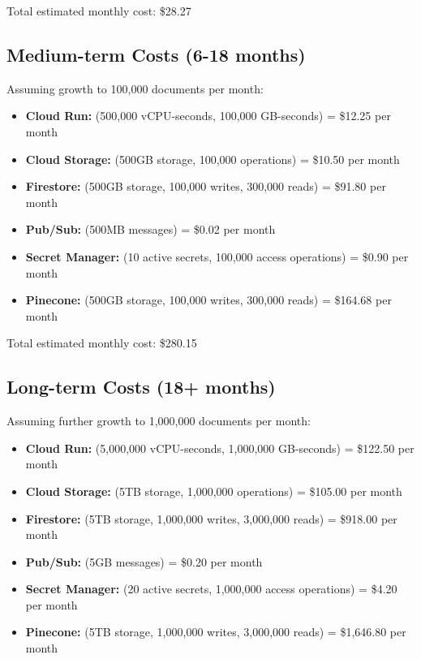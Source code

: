 \documentclass[a4paper, 12pt]{report}
\begin{document}
Total estimated monthly cost: \$28.27

\subsection{Medium-term Costs (6-18 months)}

Assuming growth to 100,000 documents per month:

\begin{itemize}
    \item \textbf{Cloud Run:} (500,000 vCPU-seconds, 100,000 GB-seconds) = \$12.25 per month
    \item \textbf{Cloud Storage:} (500GB storage, 100,000 operations) = \$10.50 per month
    \item \textbf{Firestore:} (500GB storage, 100,000 writes, 300,000 reads) = \$91.80 per month
    \item \textbf{Pub/Sub:} (500MB messages) = \$0.02 per month
    \item \textbf{Secret Manager:} (10 active secrets, 100,000 access operations) = \$0.90 per month
    \item \textbf{Pinecone:} (500GB storage, 100,000 writes, 300,000 reads) = \$164.68 per month
\end{itemize}

Total estimated monthly cost: \$280.15

\subsection{Long-term Costs (18+ months)}

Assuming further growth to 1,000,000 documents per month:

\begin{itemize}
    \item \textbf{Cloud Run:} (5,000,000 vCPU-seconds, 1,000,000 GB-seconds) = \$122.50 per month
    \item \textbf{Cloud Storage:} (5TB storage, 1,000,000 operations) = \$105.00 per month
    \item \textbf{Firestore:} (5TB storage, 1,000,000 writes, 3,000,000 reads) = \$918.00 per month
    \item \textbf{Pub/Sub:} (5GB messages) = \$0.20 per month
    \item \textbf{Secret Manager:} (20 active secrets, 1,000,000 access operations) = \$4.20 per month
    \item \textbf{Pinecone:} (5TB storage, 1,000,000 writes, 3,000,000 reads) = \$1,646.80 per month
\end{itemize}
\end{document}
